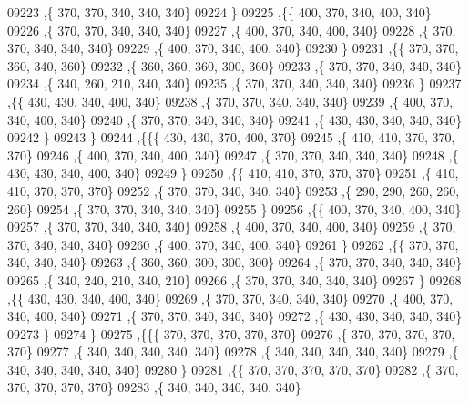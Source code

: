 \begin{DoxyCode}
09223     ,\{   370,   370,   340,   340,   340\}
09224     \}
09225    ,\{\{   400,   370,   340,   400,   340\}
09226     ,\{   370,   370,   340,   340,   340\}
09227     ,\{   400,   370,   340,   400,   340\}
09228     ,\{   370,   370,   340,   340,   340\}
09229     ,\{   400,   370,   340,   400,   340\}
09230     \}
09231    ,\{\{   370,   370,   360,   340,   360\}
09232     ,\{   360,   360,   360,   300,   360\}
09233     ,\{   370,   370,   340,   340,   340\}
09234     ,\{   340,   260,   210,   340,   340\}
09235     ,\{   370,   370,   340,   340,   340\}
09236     \}
09237    ,\{\{   430,   430,   340,   400,   340\}
09238     ,\{   370,   370,   340,   340,   340\}
09239     ,\{   400,   370,   340,   400,   340\}
09240     ,\{   370,   370,   340,   340,   340\}
09241     ,\{   430,   430,   340,   340,   340\}
09242     \}
09243    \}
09244   ,\{\{\{   430,   430,   370,   400,   370\}
09245     ,\{   410,   410,   370,   370,   370\}
09246     ,\{   400,   370,   340,   400,   340\}
09247     ,\{   370,   370,   340,   340,   340\}
09248     ,\{   430,   430,   340,   400,   340\}
09249     \}
09250    ,\{\{   410,   410,   370,   370,   370\}
09251     ,\{   410,   410,   370,   370,   370\}
09252     ,\{   370,   370,   340,   340,   340\}
09253     ,\{   290,   290,   260,   260,   260\}
09254     ,\{   370,   370,   340,   340,   340\}
09255     \}
09256    ,\{\{   400,   370,   340,   400,   340\}
09257     ,\{   370,   370,   340,   340,   340\}
09258     ,\{   400,   370,   340,   400,   340\}
09259     ,\{   370,   370,   340,   340,   340\}
09260     ,\{   400,   370,   340,   400,   340\}
09261     \}
09262    ,\{\{   370,   370,   340,   340,   340\}
09263     ,\{   360,   360,   300,   300,   300\}
09264     ,\{   370,   370,   340,   340,   340\}
09265     ,\{   340,   240,   210,   340,   210\}
09266     ,\{   370,   370,   340,   340,   340\}
09267     \}
09268    ,\{\{   430,   430,   340,   400,   340\}
09269     ,\{   370,   370,   340,   340,   340\}
09270     ,\{   400,   370,   340,   400,   340\}
09271     ,\{   370,   370,   340,   340,   340\}
09272     ,\{   430,   430,   340,   340,   340\}
09273     \}
09274    \}
09275   ,\{\{\{   370,   370,   370,   370,   370\}
09276     ,\{   370,   370,   370,   370,   370\}
09277     ,\{   340,   340,   340,   340,   340\}
09278     ,\{   340,   340,   340,   340,   340\}
09279     ,\{   340,   340,   340,   340,   340\}
09280     \}
09281    ,\{\{   370,   370,   370,   370,   370\}
09282     ,\{   370,   370,   370,   370,   370\}
09283     ,\{   340,   340,   340,   340,   340\}

\end{DoxyCode}
